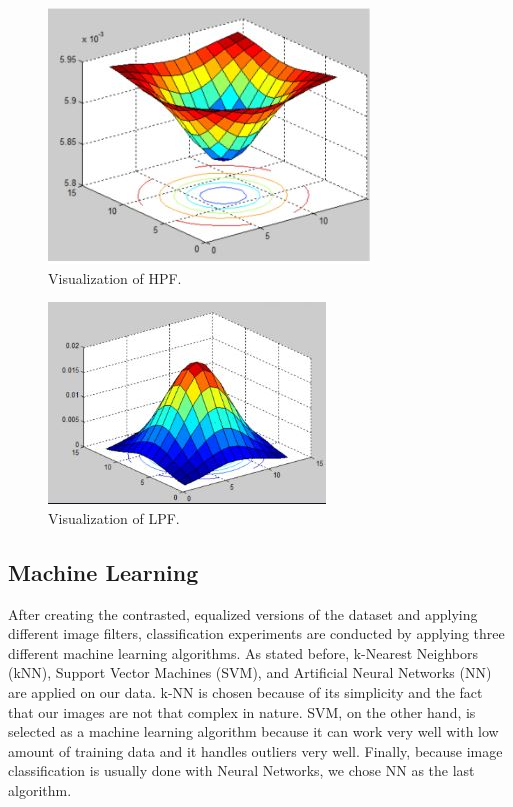 \documentclass[conference]{IEEEtran}
\begin{document}
\begin{figure}[h]
\centering
\includegraphics[scale=0.4]{figures/hpf_filter.JPG}
\caption{Visualization of HPF.}
\end{figure}
\begin{figure}[h]
\centering
\includegraphics[scale=0.4]{figures/lpf_filter.JPG}
\caption{Visualization of LPF.}
\end{figure}

\subsection{Machine Learning}
After creating the contrasted, equalized versions of the dataset and applying different image filters, classification experiments are conducted by applying three different machine learning algorithms. As stated before, k-Nearest Neighbors (kNN), Support Vector Machines (SVM), and Artificial Neural Networks (NN) are applied on our data. k-NN is chosen because of its simplicity and the fact that our images are not that complex in nature. SVM, on the other hand, is selected as a machine learning algorithm because it can work very well with low amount of training data and it handles outliers very well. Finally, because image classification is usually done with Neural Networks, we chose NN as the last algorithm. 
\end{document}
